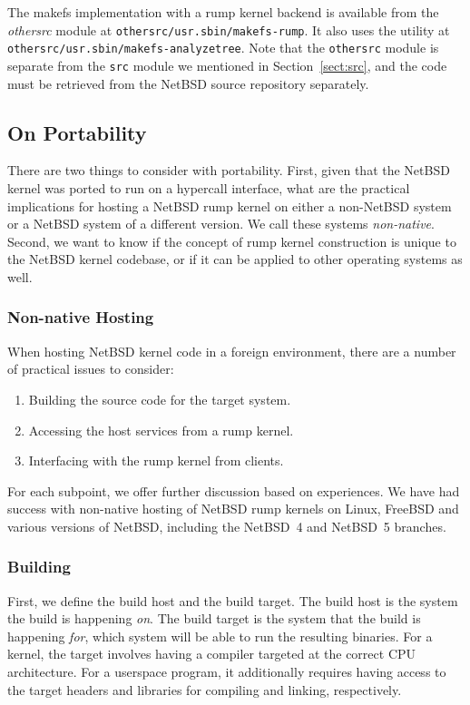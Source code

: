 The makefs implementation with a rump kernel backend is available
from the \textit{othersrc} module
at \texttt{othersrc/usr.sbin/makefs-rump}.  It also uses the utility at
\texttt{othersrc/usr.sbin/makefs-analyzetree}.  Note that the
\texttt{othersrc} module is separate from the \texttt{src} module
we mentioned in Section~\ref{sect:src}, and the code must be retrieved
from the NetBSD source repository separately.

\subsection{On Portability}

There are two things to consider with portability.  First, given that
the NetBSD kernel was ported to run on a hypercall interface, what
are the practical implications for hosting a NetBSD rump kernel on
either a non-NetBSD system or a NetBSD system of a different version.
We call these systems \textit{non-native}.  Second, we want to know if
the concept of rump kernel construction is unique to the NetBSD kernel
codebase, or if it can be applied to other operating systems as well.

\subsubsection{Non-native Hosting}
\label{sect:foreignhost}

When hosting NetBSD kernel code in a foreign environment, there are a
number of practical issues to consider:

\begin{enumerate}
\item	Building the source code for the target system.
\item	Accessing the host services from a rump kernel.
\item   Interfacing with the rump kernel from clients.
\end{enumerate}

For each subpoint, we offer further discussion based on experiences.
We have had success with non-native hosting of NetBSD rump kernels
on Linux, FreeBSD and various versions of NetBSD, including the
NetBSD~4 and NetBSD~5 branches.

\subsubsection*{Building}

First, we define the build host and the build target.  The build
host is the system the build is happening \textit{on}.  The build
target is the system that the build is happening \textit{for}, \ie
which system will be able to run the resulting binaries.  For a
kernel, the target involves having a compiler targeted at the
correct CPU architecture.  For a userspace program, it additionally
requires having access to the target headers and libraries for
compiling and linking, respectively.

